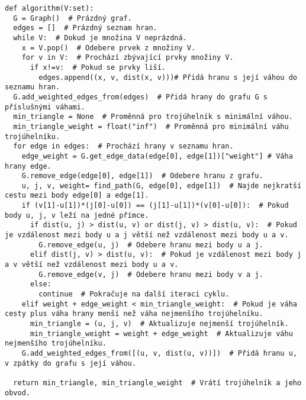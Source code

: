 \begin{mdframed}[style=MyFrame]
\begin{lstlisting}[style=metoo]
def algorithm(V:set):
  G = Graph()  # Prázdný graf.
  edges = []  # Prázdný seznam hran.
  while V:  # Dokud je množina V neprázdná.
    x = V.pop()  # Odebere prvek z množiny V.
    for v in V:  # Prochází zbývající prvky množiny V.
      if x!=v:  # Pokud se prvky liší.
        edges.append((x, v, dist(x, v)))# Přidá hranu s její váhou do seznamu hran.
  G.add_weighted_edges_from(edges)  # Přidá hrany do grafu G s příslušnými váhami.
  min_triangle = None  # Proměnná pro trojúhelník s minimální váhou.
  min_triangle_weight = float("inf")  # Proměnná pro minimální váhu trojúhelníku.
  for edge in edges:  # Prochází hrany v seznamu hran.
    edge_weight = G.get_edge_data(edge[0], edge[1])["weight"] # Váha hrany edge.
    G.remove_edge(edge[0], edge[1])  # Odebere hranu z grafu.
    u, j, v, weight= find_path(G, edge[0], edge[1])  # Najde nejkratší cestu mezi body edge[0] a edge[1].
    if (v[1]-u[1])*(j[0]-u[0]) == (j[1]-u[1])*(v[0]-u[0]):  # Pokud body u, j, v leží na jedné přímce.
      if dist(u, j) > dist(u, v) or dist(j, v) > dist(u, v):  # Pokud je vzdálenost mezi body u a j větší než vzdálenost mezi body u a v.
        G.remove_edge(u, j)  # Odebere hranu mezi body u a j.
      elif dist(j, v) > dist(u, v):  # Pokud je vzdálenost mezi body j a v větší než vzdálenost mezi body u a v.
        G.remove_edge(v, j)  # Odebere hranu mezi body v a j.
      else:
        continue  # Pokračuje na další iteraci cyklu.
    elif weight + edge_weight < min_triangle_weight:  # Pokud je váha cesty plus váha hrany menší než váha nejmenšího trojúhelníku.
      min_triangle = (u, j, v)  # Aktualizuje nejmenší trojúhelník.
      min_triangle_weight = weight + edge_weight  # Aktualizuje váhu nejmenšího trojúhelníku.
    G.add_weighted_edges_from([(u, v, dist(u, v))])  # Přidá hranu u, v zpátky do grafu s její váhou.

  return min_triangle, min_triangle_weight  # Vrátí trojúhelník a jeho obvod.
\end{lstlisting}
\end{mdframed}